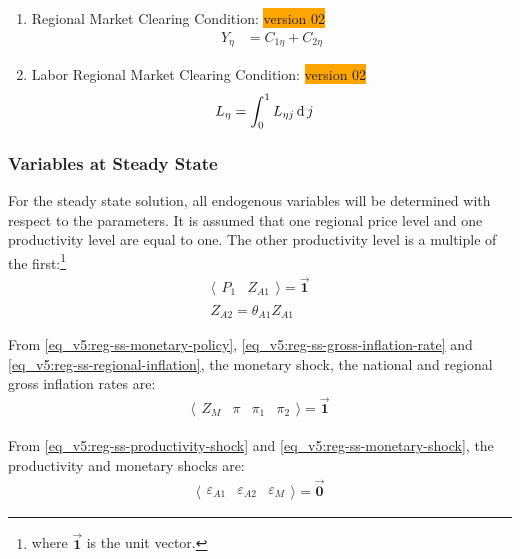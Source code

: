 \documentclass[../thesis.tex]{subfiles}
\begin{document}
\begin{enumerate}
	\item Regional Market Clearing Condition: \colorbox{orange}{version 02}
	\begin{align}
		Y_{\eta} &= C_{1\eta} + C_{2\eta} \label{eq_v5:reg-ss-regional-demand}
	\end{align}
	
	\item Labor Regional Market Clearing Condition: \colorbox{orange}{version 02}
	\begin{align}
		L_{\eta} &= \int_{0}^{1} L_{\eta j} \operatorname{d} j \label{eq_v5:reg-ss-market-clearing-condition-L}
	\end{align}
	
\end{enumerate}

\newpage


\subsubsection{Variables at Steady State}

	For the steady state solution, all endogenous variables will be determined with respect to the parameters. It is assumed that one regional price level and one productivity level are equal to one. The other productivity level is a multiple of the first:\footnote{where $\vec{\bm{1}}$ is the unit vector.}
	\begin{align}
		\langle \begin{matrix} P_{1} & Z_{A1} \end{matrix} \rangle = \vec{\bm{1}} \label{eq_v5:reg-ss-p1-za1} \\
		Z_{A2} = \theta_{A1} Z_{A1} \label{eq_v5:reg-ss-za2-0}
	\end{align}
	
	From \ref{eq_v5:reg-ss-monetary-policy}, \ref{eq_v5:reg-ss-gross-inflation-rate} and \ref{eq_v5:reg-ss-regional-inflation}, the monetary shock, the national and regional gross inflation rates are:
	\begin{align}
		\langle \begin{matrix} Z_{M} & \pi & \pi_{1} & \pi_{2} \end{matrix} \rangle  = \vec{\bm{1}}
	\end{align}
	
	From \ref{eq_v5:reg-ss-productivity-shock} and \ref{eq_v5:reg-ss-monetary-shock}, the productivity and monetary shocks are:
	\begin{align}
		\langle \begin{matrix} \varepsilon_{A1} & \varepsilon_{A2} & \varepsilon_{M} \end{matrix} \rangle = \vec{\bm{0}} \label{eq_v5:reg-ss-epsilon}
	\end{align}
	
\end{document}
